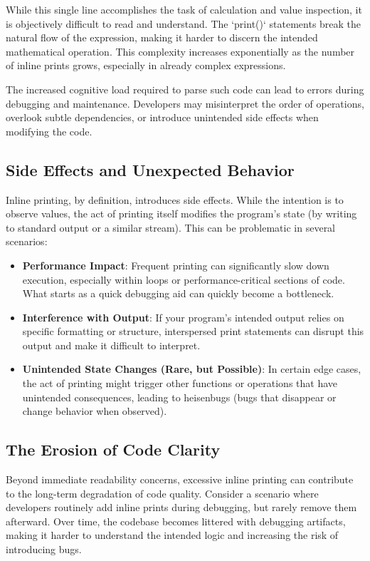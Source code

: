 \documentclass{article}
\begin{document}
{{{{While this single line accomplishes the task of calculation and value inspection, it is objectively difficult to read and understand. The `print()` statements break the natural flow of the expression, making it harder to discern the intended mathematical operation. This complexity increases exponentially as the number of inline prints grows, especially in already complex expressions.

The increased cognitive load required to parse such code can lead to errors during debugging and maintenance. Developers may misinterpret the order of operations, overlook subtle dependencies, or introduce unintended side effects when modifying the code.

\subsection*{Side Effects and Unexpected Behavior}

Inline printing, by definition, introduces side effects. While the intention is to observe values, the act of printing itself modifies the program's state (by writing to standard output or a similar stream).  This can be problematic in several scenarios:

\begin{itemize}
    \item \textbf{Performance Impact}: Frequent printing can significantly slow down execution, especially within loops or performance-critical sections of code. What starts as a quick debugging aid can quickly become a bottleneck.
    \item \textbf{Interference with Output}: If your program's intended output relies on specific formatting or structure, interspersed print statements can disrupt this output and make it difficult to interpret.
    \item \textbf{Unintended State Changes (Rare, but Possible)}: In certain edge cases, the act of printing might trigger other functions or operations that have unintended consequences, leading to heisenbugs (bugs that disappear or change behavior when observed).
\end{itemize}

\subsection*{The Erosion of Code Clarity}

Beyond immediate readability concerns, excessive inline printing can contribute to the long-term degradation of code quality.  Consider a scenario where developers routinely add inline prints during debugging, but rarely remove them afterward. Over time, the codebase becomes littered with debugging artifacts, making it harder to understand the intended logic and increasing the risk of introducing bugs.

}}}}
\end{document}
